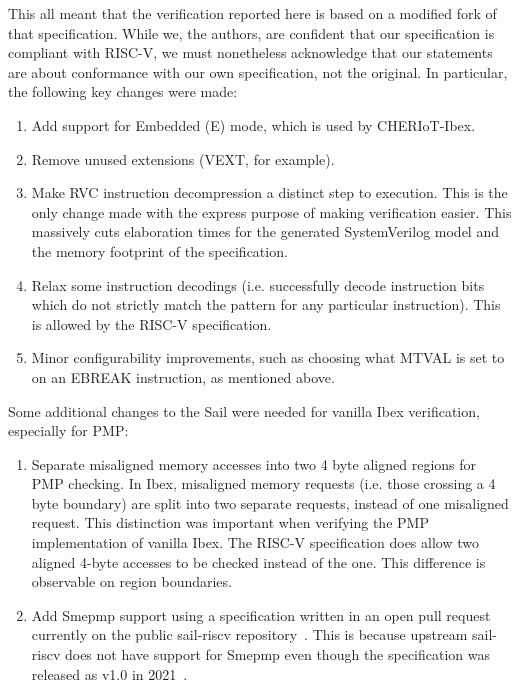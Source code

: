 \documentclass[10pt,conference]{IEEEtran}
\begin{document}
This all meant that the verification reported here is based on a modified
fork of that specification.  While we, the authors, are confident that our
specification is compliant with RISC-V, we must nonetheless acknowledge
that our statements are about conformance with our own specification, not
the original. In particular, the following key changes were made:

\begin{enumerate}
  \item Add support for Embedded (E) mode, which is used by CHERIoT-Ibex.
  \item Remove unused extensions (VEXT, for example).
  \item Make RVC instruction decompression a distinct step to execution. This is the only change
    made with the express purpose of making verification easier. This
    massively cuts elaboration times for the generated SystemVerilog model
    and the memory footprint of the specification.
  \item Relax some instruction decodings (i.e. successfully decode instruction bits which
    do not strictly match the pattern for any particular instruction). This is allowed by the RISC-V specification.
  \item Minor configurability improvements, such as choosing what MTVAL is set
    to on an EBREAK instruction, as mentioned above.
\end{enumerate}

Some additional changes to the Sail were needed for vanilla Ibex verification,
especially for PMP:

\begin{enumerate}
  \item Separate misaligned memory accesses into two 4 byte aligned regions
    for PMP checking. In Ibex, misaligned memory requests
    (i.e. those crossing a 4 byte boundary) are split into two separate requests,
    instead of one misaligned request. This distinction was important when verifying the PMP
    implementation of vanilla Ibex. The RISC-V specification does allow
    two aligned 4-byte accesses to be checked instead of the one.
    This difference is observable on region boundaries.
  \item Add Smepmp support using a specification
    written in an open pull request currently on the public sail-riscv
    repository~\cite{sail-risc-v-smepmp}.
    This is because upstream sail-riscv does not have support for Smepmp even though the specification was released as v1.0 in 2021~\cite{smepmp}.
\end{enumerate}
\end{document}
